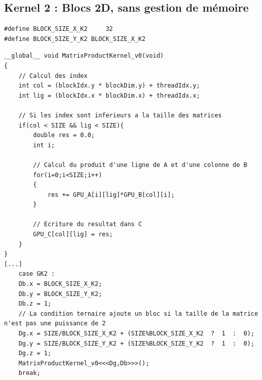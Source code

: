 \documentclass[	DIV=calc,%
							paper=a4,%
							fontsize=11pt%
							]{scrartcl}	 					%
\begin{document}
\subsection{Kernel 2 : Blocs 2D, sans gestion de mémoire}
\begin{lstlisting}
#define BLOCK_SIZE_X_K2     32
#define BLOCK_SIZE_Y_K2 BLOCK_SIZE_X_K2
\end{lstlisting}
\begin{lstlisting}
__global__ void MatrixProductKernel_v0(void)
{
	// Calcul des index
	int col = (blockIdx.y * blockDim.y) + threadIdx.y;
	int lig = (blockIdx.x * blockDim.x) + threadIdx.x;
	
	// Si les index sont inferieurs a la taille des matrices
	if(col < SIZE && lig < SIZE){ 
		double res = 0.0;
		int i;
		
		// Calcul du produit d'une ligne de A et d'une colonne de B
		for(i=0;i<SIZE;i++)
		{
			res += GPU_A[i][lig]*GPU_B[col][i];
		}
		
		// Ecriture du resultat dans C
		GPU_C[col][lig] = res;
	}
}
[...]
	case GK2 :
	Db.x = BLOCK_SIZE_X_K2;
	Db.y = BLOCK_SIZE_Y_K2;
	Db.z = 1;
	// La condition ternaire ajoute un bloc si la taille de la matrice n'est pas une puissance de 2
	Dg.x = SIZE/BLOCK_SIZE_X_K2 + (SIZE%BLOCK_SIZE_X_K2  ?  1  :  0);
	Dg.y = SIZE/BLOCK_SIZE_Y_K2 + (SIZE%BLOCK_SIZE_Y_K2  ?  1  :  0);
	Dg.z = 1;
	MatrixProductKernel_v0<<<Dg,Db>>>();
	break;	
\end{lstlisting}
\end{document}
